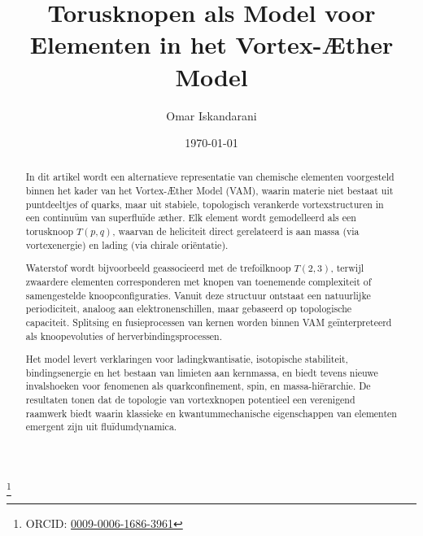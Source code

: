 \documentclass[a4paper, aps,preprint,superscriptaddress, 12pt]{revtex4}
\begin{document}
    \author{Omar Iskandarani}
    \title{Torusknopen als Model voor Elementen in het Vortex-Æther Model}

    \date{\today}
    \thanks{ORCID: \href{https://orcid.org/0009-0006-1686-3961}{0009-0006-1686-3961}}

    \begin{abstract}
        In dit artikel wordt een alternatieve representatie van chemische elementen voorgesteld binnen het kader van het Vortex-Æther Model (VAM), waarin materie niet bestaat uit puntdeeltjes of quarks, maar uit stabiele, topologisch verankerde vortexstructuren in een continuüm van superfluïde æther. Elk element wordt gemodelleerd als een torusknoop $T(p,q)$, waarvan de heliciteit direct gerelateerd is aan massa (via vortexenergie) en lading (via chirale oriëntatie).

        Waterstof wordt bijvoorbeeld geassocieerd met de trefoilknoop $T(2,3)$, terwijl zwaardere elementen corresponderen met knopen van toenemende complexiteit of samengestelde knoopconfiguraties. Vanuit deze structuur ontstaat een natuurlijke periodiciteit, analoog aan elektronenschillen, maar gebaseerd op topologische capaciteit. Splitsing en fusieprocessen van kernen worden binnen VAM geïnterpreteerd als knoopevoluties of herverbindingsprocessen.

        Het model levert verklaringen voor ladingkwantisatie, isotopische stabiliteit, bindingsenergie en het bestaan van limieten aan kernmassa, en biedt tevens nieuwe invalshoeken voor fenomenen als quarkconfinement, spin, en massa-hiërarchie. De resultaten tonen dat de topologie van vortexknopen potentieel een verenigend raamwerk biedt waarin klassieke en kwantummechanische eigenschappen van elementen emergent zijn uit fluïdumdynamica.
    \end{abstract}
    
    \maketitle

    
    
    
    
    
    
    
    
    
    
    
    
    
    
    
    
    


    \appendix \label{sec:Part-6}
    \label{appendix:Afleiding_massa}
    \label{appendix:Afleiding_massa_2}

    
    
\end{document}
